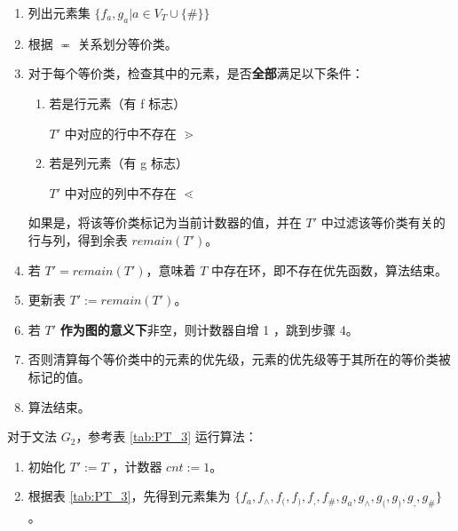 \begin{enumerate}
\begin{enumerate}
\begin{enumerate}
            \item 列出元素集 $\{f_a, g_a | a \in V_T \cup \{\#\}\}$

            \item 根据 $\eqcirc$ 关系划分等价类。

            \item 对于每个等价类，检查其中的元素，是否\textbf{全部}满足以下条件：
            
            \begin{enumerate}
                \item 若是行元素（有 f 标志）
                
                $T'$ 中对应的行中不存在 $\gtrdot$
                
                \item 若是列元素（有 g 标志）
                
                $T'$ 中对应的列中不存在 $\lessdot$
                
            \end{enumerate}

            如果是，将该等价类标记为当前计数器的值，并在 $T'$ 中过滤该等价类有关的行与列，得到余表 $remain(T')$。
            
            \item 若 $T' = remain(T')$，意味着 $T$ 中存在环，即不存在优先函数，算法结束。
            
            \item 更新表 $T' := remain(T')$。
            
            \item 若 $T'$ \textbf{作为图的意义下}非空，则计数器自增 1 ，跳到步骤 4。
            
            \item 否则清算每个等价类中的元素的优先级，元素的优先级等于其所在的等价类被标记的值。
            
            \item 算法结束。

        \end{enumerate}
        
        对于文法 $G_2$，参考表 \ref{tab:PT_3} 运行算法：
        
        \begin{enumerate}
            \item 初始化 $T' := T$ ，计数器 $cnt := 1$。
            
            \item 根据表 \ref{tab:PT_3}，先得到元素集为 $\{f_a, f_\wedge, f_(, f_), f_,, f_\#, g_a, g_\wedge, g_(, g_), g_,, g_\#\}$。
            

\end{enumerate}
\end{enumerate}
\end{enumerate}
